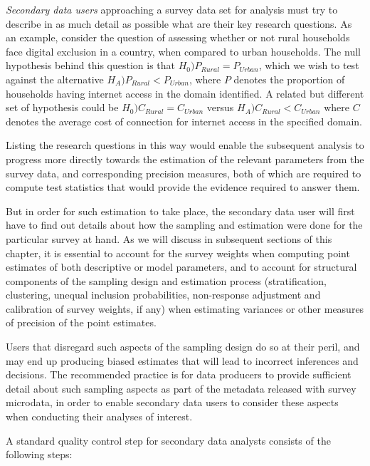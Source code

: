 \documentclass[
  12pt,
]{book}
\begin{document}
\emph{Secondary data users} approaching a survey data set for analysis must try to describe in as much detail as possible what are their key research questions. As an example, consider the question of assessing whether or not rural households face digital exclusion in a country, when compared to urban households. The null hypothesis behind this question is that \(H_0) P_{Rural} = P_{Urban}\), which we wish to test against the alternative \(H_A) P_{Rural} < P_{Urban}\), where \(P\) denotes the proportion of households having internet access in the domain identified. A related but different set of hypothesis could be \(H_0) C_{Rural} = C_{Urban}\) versus \(H_A) C_{Rural} < C_{Urban}\) where \(C\) denotes the average cost of connection for internet access in the specified domain.

Listing the research questions in this way would enable the subsequent analysis to progress more directly towards the estimation of the relevant parameters from the survey data, and corresponding precision measures, both of which are required to compute test statistics that would provide the evidence required to answer them.

But in order for such estimation to take place, the secondary data user will first have to find out details about how the sampling and estimation were done for the particular survey at hand. As we will discuss in subsequent sections of this chapter, it is essential to account for the survey weights when computing point estimates of both descriptive or model parameters, and to account for structural components of the sampling design and estimation process (stratification, clustering, unequal inclusion probabilities, non-response adjustment and calibration of survey weights, if any) when estimating variances or other measures of precision of the point estimates.

Users that disregard such aspects of the sampling design do so at their peril, and may end up producing biased estimates that will lead to incorrect inferences and decisions. The recommended practice is for data producers to provide sufficient detail about such sampling aspects as part of the metadata released with survey microdata, in order to enable secondary data users to consider these aspects when conducting their analyses of interest.

A standard quality control step for secondary data analysts consists of the following steps:
\end{document}
